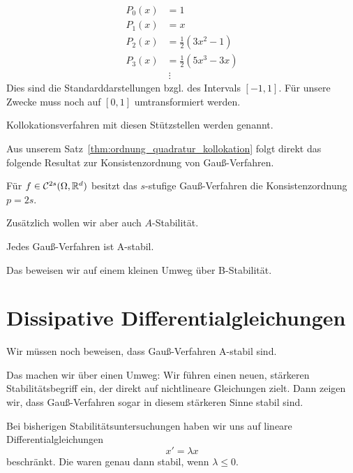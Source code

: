 \begin{definition}
	\begin{align*}
		P_0(x) &= 1 \\
		P_1(x) &= x \\
		P_2(x) &= \frac{1}{2}(3x^2-1) \\
		P_3(x) &= \frac{1}{2}(5x^3-3x) \\
		     &\ \vdots
	\end{align*}
	Dies sind die Standarddarstellungen bzgl. des Intervals $[-1,1]$. Für unsere Zwecke muss noch auf $[0,1]$ umtransformiert werden.
\end{definition}

Kollokationsverfahren mit diesen Stützstellen werden  genannt.

Aus unserem Satz~\ref{thm:ordnung_quadratur_kollokation} folgt direkt das folgende Resultat zur Konsistenzordnung von Gauß-Verfahren.

\begin{satz}
	Für $f\in\mathcal C^{2s}(\Omega,\mathbb R^d)$ besitzt das $s$-stufige Gauß-Verfahren die Konsistenzordnung $p=2s$.
\end{satz}

Zusätzlich wollen wir aber auch $A$-Stabilität.

\begin{satz}
   Jedes Gauß-Verfahren ist A-stabil.
\end{satz}

Das beweisen wir auf einem kleinen Umweg über B-Stabilität.



\section{Dissipative Differentialgleichungen}

Wir müssen noch beweisen, dass Gauß-Verfahren A-stabil sind.

Das machen wir über einen Umweg: Wir führen einen neuen, stärkeren Stabilitätsbegriff ein, der direkt auf nichtlineare Gleichungen zielt. Dann zeigen wir, dass Gauß-Verfahren sogar in diesem stärkeren Sinne stabil sind.

Bei bisherigen Stabilitätsuntersuchungen haben wir uns auf lineare Differentialgleichungen
\begin{equation}
\label{eq:dissipativitaet_lineare_skalare_gleichung}
	x'=\lambda x
\end{equation}
beschränkt. Die waren genau dann stabil, wenn $\lambda\leq 0$.

